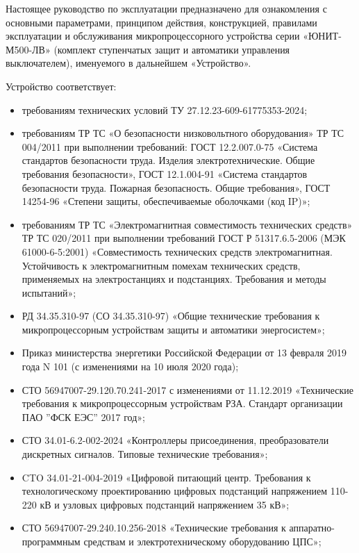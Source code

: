 \par
Настоящее руководство по эксплуатации предназначено для ознакомления с основными параметрами, принципом действия, конструкцией, правилами эксплуатации и обслуживания микропроцессорного устройства серии «ЮНИТ-М500-ЛВ» (комплект ступенчатых защит и автоматики управления выключателем), именуемого в дальнейшем «Устройство».

\par
Устройство соответствует:
\begin{itemize}
\item требованиям технических условий ТУ 27.12.23-609-61775353-2024;
\item требованиям ТР ТС «О безопасности низковольтного оборудования» ТР ТС 004/2011 при выполнении требований: ГОСТ 12.2.007.0-75 «Система стандартов безопасности труда. Изделия электротехнические. Общие требования безопасности», ГОСТ 12.1.004-91 «Система стандартов безопасности труда. Пожарная безопасность. Общие требования», ГОСТ 14254-96 «Степени защиты, обеспечиваемые оболочками (код IP)»; 
\item требованиям ТР ТС «Электромагнитная совместимость технических средств» ТР ТС 020/2011 при выполнении требований ГОСТ Р 51317.6.5-2006 (МЭК 61000-6-5:2001) «Совместимость технических средств электромагнитная. Устойчивость к электромагнитным помехам технических средств, применяемых на электростанциях и подстанциях. Требования и методы испытаний»;
\item РД 34.35.310-97 (СО 34.35.310-97) «Общие технические требования к микропроцессорным устройствам защиты и автоматики энергосистем»;
\item Приказ министерства энергетики Российской Федерации от 13 февраля 2019 года N 101 (с изменениями на 10 июля 2020 года);
\item СТО 56947007-29.120.70.241-2017 с изменениями от 11.12.2019 «Технические требования к микропроцессорным устройствам РЗА. Стандарт организации ПАО ''ФСК ЕЭС'' 2017 год»;
\item СТО 34.01-6.2-002-2024 «Контроллеры присоединения, преобразователи дискретных сигналов. Типовые технические требования»;
\item CTO 34.01-21-004-2019 «Цифровой питающий центр. Требования к технологическому проектированию цифровых подстанций напряжением 110-220 кВ и узловых цифровых подстанций напряжением 35 кВ»;
\item СТО 56947007-29.240.10.256-2018 «Технические требования к аппаратно-программным средствам и электротехническому оборудованию ЦПС»;

\end{itemize}
